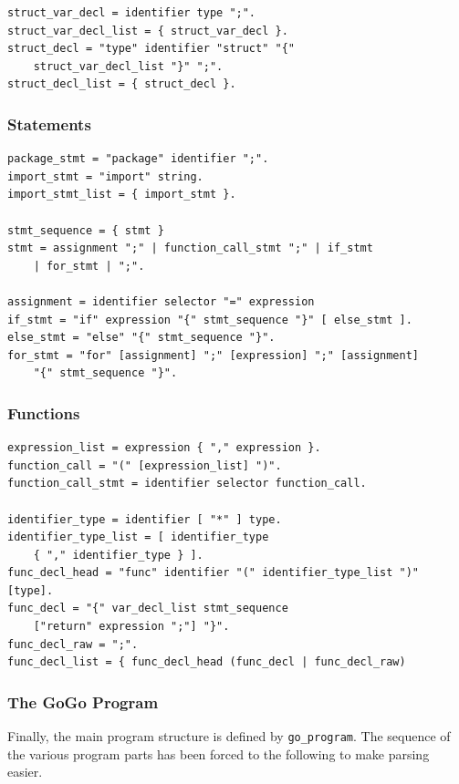 \documentclass[a4paper]{scrartcl}
\let\subsection\subsubsection
\let\subsubsection\paragraph
\let\paragraph\subparagraph
\let\subparagraph\undefined
\begin{document}
        \begin{lstlisting}[caption=Structs]
struct_var_decl = identifier type ";".
struct_var_decl_list = { struct_var_decl }.
struct_decl = "type" identifier "struct" "{" 
    struct_var_decl_list "}" ";".
struct_decl_list = { struct_decl }. 
        \end{lstlisting}

      \subsection*{Statements}

        \begin{lstlisting}[caption=Statements]
package_stmt = "package" identifier ";".
import_stmt = "import" string.
import_stmt_list = { import_stmt }.

stmt_sequence = { stmt }
stmt = assignment ";" | function_call_stmt ";" | if_stmt 
    | for_stmt | ";".

assignment = identifier selector "=" expression
if_stmt = "if" expression "{" stmt_sequence "}" [ else_stmt ].
else_stmt = "else" "{" stmt_sequence "}".
for_stmt = "for" [assignment] ";" [expression] ";" [assignment] 
    "{" stmt_sequence "}".
        \end{lstlisting}

      \subsection*{Functions}

        \begin{lstlisting}[caption=Functions]
expression_list = expression { "," expression }.
function_call = "(" [expression_list] ")".
function_call_stmt = identifier selector function_call.

identifier_type = identifier [ "*" ] type.
identifier_type_list = [ identifier_type 
    { "," identifier_type } ].
func_decl_head = "func" identifier "(" identifier_type_list ")"  [type].
func_decl = "{" var_decl_list stmt_sequence 
    ["return" expression ";"] "}".
func_decl_raw = ";".
func_decl_list = { func_decl_head (func_decl | func_decl_raw) 
        \end{lstlisting}

      \subsection*{The GoGo Program}
        Finally, the main program structure is defined by \texttt{go\_program}. The sequence of the various program parts has been forced to the following to make parsing easier.
\end{document}
